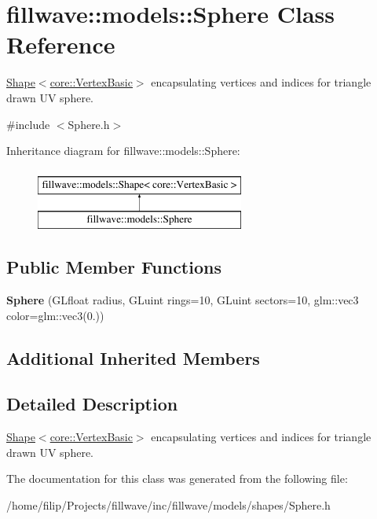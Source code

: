 \hypertarget{classfillwave_1_1models_1_1Sphere}{}\section{fillwave\+:\+:models\+:\+:Sphere Class Reference}
\label{classfillwave_1_1models_1_1Sphere}


\hyperlink{classfillwave_1_1models_1_1Shape}{Shape$<$core\+::\+Vertex\+Basic$>$} encapsulating vertices and indices for triangle drawn U\+V sphere.  




{\ttfamily \#include $<$Sphere.\+h$>$}

Inheritance diagram for fillwave\+:\+:models\+:\+:Sphere\+:\begin{figure}[H]
\begin{center}
\leavevmode
\includegraphics[height=2.000000cm]{classfillwave_1_1models_1_1Sphere}
\end{center}
\end{figure}
\subsection*{Public Member Functions}
\begin{DoxyCompactItemize}
\item 
\hypertarget{classfillwave_1_1models_1_1Sphere_a86e509942e7b30fc2823d9ff5e42e5e2}{}{\bfseries Sphere} (G\+Lfloat radius, G\+Luint rings=10, G\+Luint sectors=10, glm\+::vec3 color=glm\+::vec3(0.))\label{classfillwave_1_1models_1_1Sphere_a86e509942e7b30fc2823d9ff5e42e5e2}

\end{DoxyCompactItemize}
\subsection*{Additional Inherited Members}


\subsection{Detailed Description}
\hyperlink{classfillwave_1_1models_1_1Shape}{Shape$<$core\+::\+Vertex\+Basic$>$} encapsulating vertices and indices for triangle drawn U\+V sphere. 

The documentation for this class was generated from the following file\+:\begin{DoxyCompactItemize}
\item 
/home/filip/\+Projects/fillwave/inc/fillwave/models/shapes/Sphere.\+h\end{DoxyCompactItemize}
